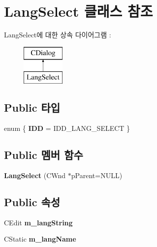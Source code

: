 \hypertarget{class_lang_select}{}\section{Lang\+Select 클래스 참조}
\label{class_lang_select}
Lang\+Select에 대한 상속 다이어그램 \+: \begin{figure}[H]
\begin{center}
\leavevmode
\includegraphics[height=2.000000cm]{class_lang_select}
\end{center}
\end{figure}
\subsection*{Public 타입}
\begin{DoxyCompactItemize}
\item 
\mbox{\label{class_lang_select_af4e6d80a5f0f0e069d0e56b265244d4d}} 
enum \{ {\bfseries I\+DD} = I\+D\+D\+\_\+\+L\+A\+N\+G\+\_\+\+S\+E\+L\+E\+CT
 \}
\end{DoxyCompactItemize}
\subsection*{Public 멤버 함수}
\begin{DoxyCompactItemize}
\item 
\mbox{\label{class_lang_select_a87e6124e69b3969d3f1494751c08af6e}} 
{\bfseries Lang\+Select} (C\+Wnd $\ast$p\+Parent=N\+U\+LL)
\end{DoxyCompactItemize}
\subsection*{Public 속성}
\begin{DoxyCompactItemize}
\item 
\mbox{\label{class_lang_select_af75ddf60623799cb4c761692a8057b46}} 
C\+Edit {\bfseries m\+\_\+lang\+String}
\item 
\mbox{\label{class_lang_select_ab18b546f12c8230292959ce2258ef240}} 
C\+Static {\bfseries m\+\_\+lang\+Name}
\end{DoxyCompactItemize}
